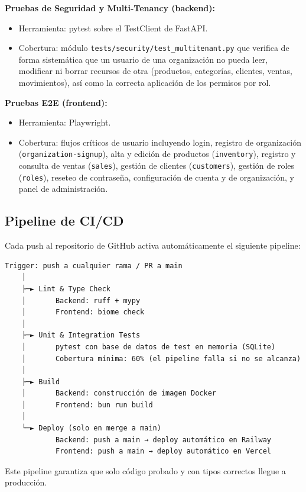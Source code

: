 \textbf{Pruebas de Seguridad y Multi-Tenancy (backend):}

\begin{itemize}
\tightlist
\item
  Herramienta: pytest sobre el TestClient de FastAPI.
\item
  Cobertura: módulo \texttt{tests/security/test\_multitenant.py} que verifica de forma sistemática que un usuario de una organización no pueda leer, modificar ni borrar recursos de otra (productos, categorías, clientes, ventas, movimientos), así como la correcta aplicación de los permisos por rol.
\end{itemize}

\textbf{Pruebas E2E (frontend):}

\begin{itemize}
\tightlist
\item
  Herramienta: Playwright.
\item
  Cobertura: flujos críticos de usuario incluyendo login, registro de organización (\texttt{organization-signup}), alta y edición de productos (\texttt{inventory}), registro y consulta de ventas (\texttt{sales}), gestión de clientes (\texttt{customers}), gestión de roles (\texttt{roles}), reseteo de contraseña, configuración de cuenta y de organización, y panel de administración.
\end{itemize}

\subsection{Pipeline de CI/CD}\label{pipeline-de-cicd}

Cada push al repositorio de GitHub activa automáticamente el siguiente pipeline:

\begin{verbatim}
Trigger: push a cualquier rama / PR a main
    │
    ├─► Lint & Type Check
    │       Backend: ruff + mypy
    │       Frontend: biome check
    │
    ├─► Unit & Integration Tests
    │       pytest con base de datos de test en memoria (SQLite)
    │       Cobertura mínima: 60% (el pipeline falla si no se alcanza)
    │
    ├─► Build
    │       Backend: construcción de imagen Docker
    │       Frontend: bun run build
    │
    └─► Deploy (solo en merge a main)
            Backend: push a main → deploy automático en Railway
            Frontend: push a main → deploy automático en Vercel
\end{verbatim}

Este pipeline garantiza que solo código probado y con tipos correctos llegue a producción.

